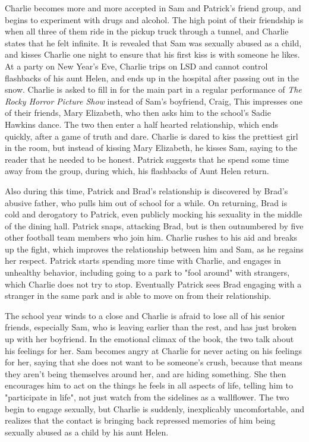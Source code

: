 	Charlie becomes more and more accepted in Sam and Patrick's friend group, and begins to experiment with drugs and alcohol. The high point of their friendship is when all three of them ride in the pickup truck through a tunnel, and Charlie states that he felt infinite. It is revealed that Sam was sexually abused as a child, and kisses Charlie one night to ensure that his first kiss is with someone he likes. At a party on New Year's Eve, Charlie trips on LSD and cannot control flashbacks of his aunt Helen, and ends up in the hospital after passing out in the snow. Charlie is asked to fill in for the main part in a regular performance of \textit{The Rocky Horror Picture Show} instead of Sam's boyfriend, Craig, This impresses one of their friends, Mary Elizabeth, who then asks him to the school's Sadie Hawkins dance. The two then enter a half hearted relationship, which ends quickly, after a game of truth and dare. Charlie is dared to kiss the prettiest girl in the room, but instead of kissing Mary Elizabeth, he kisses Sam, saying to the reader that he needed to be honest. Patrick suggests that he spend some time away from the group, during which, his flashbacks of Aunt Helen return.

	Also during this time, Patrick and Brad's relationship is discovered by Brad's abusive father, who pulls him out of school for a while. On returning, Brad is cold and derogatory to Patrick, even publicly mocking his sexuality in the middle of the dining hall. Patrick snaps, attacking Brad, but is then outnumbered by five other football team members who join him. Charlie rushes to his aid and breaks up the fight, which improves the relationship between him and Sam, as he regains her respect. Patrick starts spending more time with Charlie, and engages in unhealthy behavior, including going to a park to "fool around" with strangers, which Charlie does not try to stop. Eventually Patrick sees Brad engaging with a stranger in the same park and is able to move on from their relationship.

	The school year winds to a close and Charlie is afraid to lose all of his senior friends, especially Sam, who is leaving earlier than the rest, and has just broken up with her boyfriend. In the emotional climax of the book, the two talk about his feelings for her. Sam becomes angry at Charlie for never acting on his feelings for her, saying that she does not want to be someone's crush, because that means they aren't being themselves around her, and are hiding something. She then encourages him to act on the things he feels in all aspects of life, telling him to "participate in life", not just watch from the sidelines as a wallflower. The two begin to engage sexually, but Charlie is suddenly, inexplicably uncomfortable, and realizes that the contact is bringing back repressed memories of him being sexually abused as a child by his aunt Helen.

